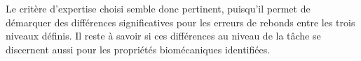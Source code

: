 



Le critère d'expertise choisi semble donc pertinent, puisqu'il permet de démarquer des différences significatives pour les erreurs de rebonds entre les trois niveaux définis. Il reste à savoir si ces différences au niveau de la tâche se discernent aussi pour les propriétés biomécaniques identifiées.

